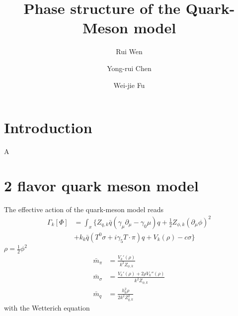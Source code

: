 \documentclass[%
reprint,
superscriptaddress,
showpacs,preprintnumbers,
 amsmath,amssymb,
 aps,
prd,
]{revtex4-1}
\begin{document}
\preprint{}

\title{Phase structure of the Quark-Meson model}

\author{Rui Wen}

\author{Yong-rui Chen}

\author{Wei-jie Fu}


\begin{abstract}

 


\end{abstract}

\maketitle


\section{Introduction}
\label{sec:intro}

A

\section{2 flavor quark meson model}
\label{sec:QM}

The effective action of the quark-meson model reads
\begin{align}
	\Gamma_k [\Phi]&=\int_x\{Z_{q,k} \bar q (\gamma_\mu \partial_\mu-\gamma_0 \mu)q +\frac{1}{2} Z_{\phi,k}(\partial_\mu \phi)^2 \nonumber\\[2ex]
	&+ k_k \bar q (T^0 \sigma +i \gamma_5 T \cdot \pi )q +V_k(\rho) - c \sigma \} \label{}
\end{align}
$\rho=\frac{1}{2}\phi^2$
\begin{align}
	\bar m_\pi&=\frac{V_k'(\rho)}{k^2 Z_{\phi,k}} \\[2ex]
	\bar m_\sigma&= \frac{V_k'(\rho)+2 \rho V_k''(\rho)} {k^2 Z_{\phi,k}}\\[2ex]
	\bar m_q&=\frac{h_k^2 \rho}{2 k^2 Z_{q,k}^2}
\end{align}
with the Wetterich equation
\end{document}
